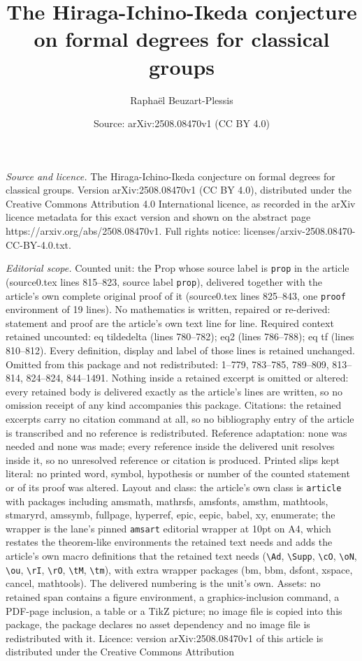 \documentclass[10pt,a4paper]{amsart}
\title[The Hiraga-Ichino-Ikeda conjecture on formal degrees for cla]{The Hiraga-Ichino-Ikeda conjecture on formal degrees for classical groups}
\author{Rapha\"el Beuzart-Plessis}
\date{Source: arXiv:2508.08470v1 (CC BY 4.0)}
\begin{document}
\maketitle

\noindent\emph{Source and licence.} The Hiraga-Ichino-Ikeda conjecture on formal degrees for classical groups. Version arXiv:2508.08470v1 (CC BY 4.0), distributed under the Creative Commons Attribution 4.0 International licence, as recorded in the arXiv licence metadata for this exact version and shown on the abstract page https://arxiv.org/abs/2508.08470v1. Full rights notice: licenses/arxiv-2508.08470-CC-BY-4.0.txt.\par\smallskip

\noindent\textit{Editorial scope.} Counted unit: the Prop whose source label is \texttt{prop} in the article (source0.tex lines 815--823, source label \texttt{prop}), delivered together with the article's own complete original proof of it (source0.tex lines 825--843, one \texttt{proof} environment of 19 lines). No mathematics is written, repaired or re-derived: statement and proof are the article's own text line for line. Required context retained uncounted: eq tildedelta (lines 780--782); eq2 (lines 786--788); eq tf (lines 810--812). Every definition, display and label of those lines is retained unchanged. Omitted from this package and not redistributed: 1--779, 783--785, 789--809, 813--814, 824--824, 844--1491. Nothing inside a retained excerpt is omitted or altered: every retained body is delivered exactly as the article's lines are written, so no omission receipt of any kind accompanies this package. Citations: the retained excerpts carry no citation command at all, so no bibliography entry of the article is transcribed and no reference is redistributed. Reference adaptation: none was needed and none was made; every reference inside the delivered unit resolves inside it, so no unresolved reference or citation is produced. Printed slips kept literal: no printed word, symbol, hypothesis or number of the counted statement or of its proof was altered. Layout and class: the article's own class is \texttt{article} with packages including amsmath, mathrsfs, amsfonts, amsthm, mathtools, stmaryrd, amssymb, fullpage, hyperref, epic, eepic, babel, xy, enumerate; the wrapper is the lane's pinned \texttt{amsart} editorial wrapper at 10pt on A4, which restates the theorem-like environments the retained text needs and adds the article's own macro definitions that the retained text needs (\texttt{\textbackslash Ad}, \texttt{\textbackslash Supp}, \texttt{\textbackslash cO}, \texttt{\textbackslash oN}, \texttt{\textbackslash ou}, \texttt{\textbackslash rI}, \texttt{\textbackslash rO}, \texttt{\textbackslash tM}, \texttt{\textbackslash tm}), with extra wrapper packages (bm, bbm, dsfont, xspace, cancel, mathtools). The delivered numbering is the unit's own. Assets: no retained span contains a figure environment, a graphics-inclusion command, a PDF-page inclusion, a table or a TikZ picture; no image file is copied into this package, the package declares no asset dependency and no image file is redistributed with it. Licence: version arXiv:2508.08470v1 of this article is distributed under the Creative Commons Attribution 
\end{document}
